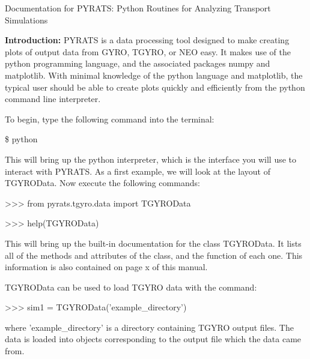 \documentclass{article}
\begin{document}
\begin{center}
\Large
Documentation for PYRATS:
Python Routines for Analyzing Transport Simulations
\end{center}
\normalsize

\noindent \textbf{Introduction: }PYRATS is a data processing tool designed to make creating plots of output data from GYRO, TGYRO, or NEO easy.  It makes use of the python programming language, and the associated packages numpy and matplotlib.  With minimal knowledge of the python language and matplotlib, the typical user should be able to create plots quickly and efficiently from the python command line interpreter.

\noindent To begin, type the following command into the terminal:
\fontfamily{\ttdefault}\selectfont

\$ python

\fontfamily{\rmdefault}\selectfont
\noindent This will bring up the python interpreter, which is the interface you will use to interact with PYRATS.  As a first example, we will look at the layout of TGYROData.  Now execute the following commands:
\fontfamily{\ttdefault}\selectfont

>>> from pyrats.tgyro.data import TGYROData

>>> help(TGYROData)

\fontfamily{\rmdefault}\selectfont
\noindent This will bring up the built-in documentation for the class TGYROData.  It lists all of the methods and attributes of the class, and the function of each one.  This information is also contained on page x of this manual.

\noindent TGYROData can be used to load TGYRO data with the command:
\fontfamily{\ttdefault}\selectfont

>>> sim1 = TGYROData('example\_directory')

\fontfamily{\rmdefault}\selectfont
\noindent where 'example\_directory' is a directory containing TGYRO output files.  The data is loaded into objects corresponding to the output file which the data came from.  
\end{document}
